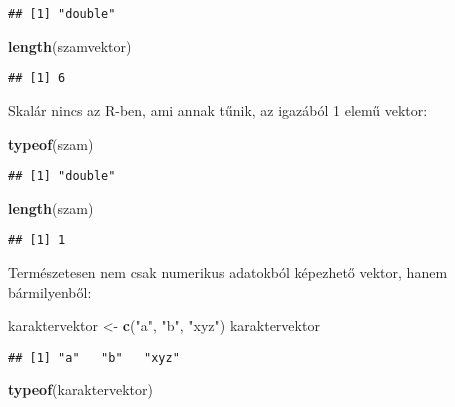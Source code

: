 \documentclass[]{book}
\newenvironment{Shaded}{\begin{snugshade}}{\end{snugshade}}
\newcommand{\KeywordTok}[1]{\textcolor[rgb]{0.13,0.29,0.53}{\textbf{#1}}}
\newcommand{\StringTok}[1]{\textcolor[rgb]{0.31,0.60,0.02}{#1}}
\newcommand{\NormalTok}[1]{#1}
\begin{document}
\begin{verbatim}
## [1] "double"
\end{verbatim}

\begin{Shaded}
\begin{Highlighting}[]
\KeywordTok{length}\NormalTok{(szamvektor)}
\end{Highlighting}
\end{Shaded}

\begin{verbatim}
## [1] 6
\end{verbatim}

Skalár nincs az R-ben, ami annak tűnik, az igazából 1 elemű vektor:

\begin{Shaded}
\begin{Highlighting}[]
\KeywordTok{typeof}\NormalTok{(szam)}
\end{Highlighting}
\end{Shaded}

\begin{verbatim}
## [1] "double"
\end{verbatim}

\begin{Shaded}
\begin{Highlighting}[]
\KeywordTok{length}\NormalTok{(szam)}
\end{Highlighting}
\end{Shaded}

\begin{verbatim}
## [1] 1
\end{verbatim}

Természetesen nem csak numerikus adatokból képezhető vektor, hanem
bármilyenből:

\begin{Shaded}
\begin{Highlighting}[]
\NormalTok{karaktervektor <-}\StringTok{ }\KeywordTok{c}\NormalTok{(}\StringTok{"a"}\NormalTok{, }\StringTok{"b"}\NormalTok{, }\StringTok{"xyz"}\NormalTok{)}
\NormalTok{karaktervektor}
\end{Highlighting}
\end{Shaded}

\begin{verbatim}
## [1] "a"   "b"   "xyz"
\end{verbatim}

\begin{Shaded}
\begin{Highlighting}[]
\KeywordTok{typeof}\NormalTok{(karaktervektor)}
\end{Highlighting}
\end{Shaded}
\end{document}
